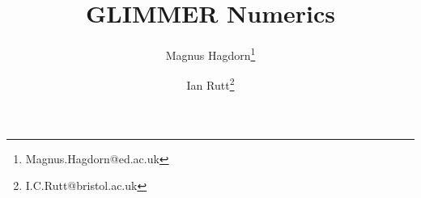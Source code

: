 \newcommand{\dir}{num}

\pagestyle{myheadings}


\title{GLIMMER {\glimmerver} Numerics}
\author{Magnus Hagdorn\thanks{Magnus.Hagdorn@ed.ac.uk} \and Ian Rutt\thanks{I.C.Rutt@bristol.ac.uk}}
\maketitle
\tableofcontents
\newpage




